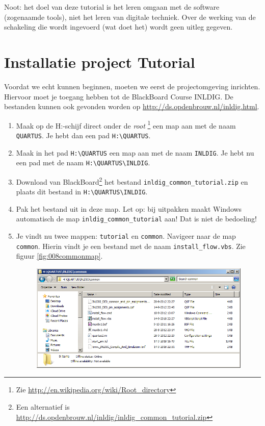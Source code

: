 \documentclass[a4paper,12pt,fleqn,twoside]{book}
\def\tutpicscale{0.455}
\begin{document}
Noot: het doel van deze tutorial is het leren omgaan met de software
(zogenaamde tools), niet het leren van digitale techniek. Over de werking van
de schakeling die wordt ingevoerd (wat doet het) wordt geen uitleg gegeven.


\section{Installatie project Tutorial}
\label{sec:installatie}
\label{sec:installatieprojecttutorial}
Voordat we echt kunnen beginnen, moeten we eerst de projectomgeving inrichten.
Hiervoor moet je toegang hebben tot de BlackBoard Course INLDIG. De bestanden
kunnen ook gevonden worden op \url{http://ds.opdenbrouw.nl/inldig.html}.

\begin{enumerate}\itemsep-1pt
\item Maak op de H:-schijf direct onder de \textsl{root}%
      \footnote{Zie \url{http://en.wikipedia.org/wiki/Root_directory}} een map
      aan met de naam \lstinline|QUARTUS|. Je hebt dan een pad
      \lstinline|H:\QUARTUS|.
\item Maak in het pad \lstinline|H:\QUARTUS| een map aan met de naam
      \lstinline|INLDIG|. Je hebt nu een pad met de naam
      \lstinline|H:\QUARTUS\INLDIG|.
\item Download van BlackBoard\footnote{Een alternatief is
      \url{http://ds.opdenbrouw.nl/inldig/inldig_common_tutorial.zip}} het
      bestand \lstinline|inldig_common_tutorial.zip| en plaats dit bestand in
      \lstinline|H:\QUARTUS\INLDIG|. 
\item Pak het bestand uit in deze map. Let op: bij uitpakken maakt Windows
      automatisch de map \lstinline|inldig_common_tutorial| aan! Dat is niet
      de bedoeling!
\item Je vindt nu twee mappen: \lstinline|tutorial| en \lstinline|common|.
      Navigeer naar de map \lstinline|common|. Hierin vindt je een bestand met
      de naam \lstinline|install_flow.vbs|. Zie figuur \ref{fig:008commonmap}.
\begin{figure}[H]
\centering
\includegraphics[scale=\tutpicscale]{008commonmap}

\end{figure}
\end{enumerate}
\end{document}
